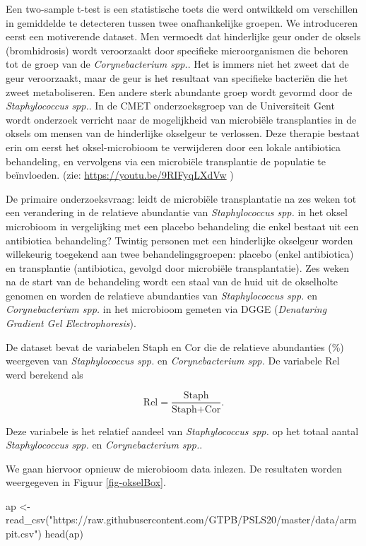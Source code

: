 \documentclass[
  dutch,
  letterpaper,
  12pt]{book}
\newenvironment{Shaded}{\begin{snugshade}}{\end{snugshade}}
\newcommand{\FunctionTok}[1]{\textcolor[rgb]{0.28,0.35,0.67}{#1}}
\newcommand{\NormalTok}[1]{\textcolor[rgb]{0.00,0.23,0.31}{#1}}
\newcommand{\OtherTok}[1]{\textcolor[rgb]{0.00,0.23,0.31}{#1}}
\newcommand{\StringTok}[1]{\textcolor[rgb]{0.13,0.47,0.30}{#1}}
\theoremstyle{definition}
\theoremstyle{definition}
\theoremstyle{definition}
\theoremstyle{remark}
\begin{document}
Een two-sample t-test is een statistische toets die werd ontwikkeld om
verschillen in gemiddelde te detecteren tussen twee onafhankelijke
groepen. We introduceren eerst een motiverende dataset. Men vermoedt dat
hinderlijke geur onder de oksels (bromhidrosis) wordt veroorzaakt door
specifieke microorganismen die behoren tot de groep van de
\emph{Corynebacterium spp.}. Het is immers niet het zweet dat de geur
veroorzaakt, maar de geur is het resultaat van specifieke bacteriën die
het zweet metaboliseren. Een andere sterk abundante groep wordt gevormd
door de \emph{Staphylococcus spp.}. In de CMET onderzoeksgroep van de
Universiteit Gent wordt onderzoek verricht naar de mogelijkheid van
microbiële transplanties in de oksels om mensen van de hinderlijke
okselgeur te verlossen. Deze therapie bestaat erin om eerst het
oksel-microbioom te verwijderen door een lokale antibiotica behandeling,
en vervolgens via een microbiële transplantie de populatie te
beïnvloeden. (zie: \url{https://youtu.be/9RIFyqLXdVw} )

De primaire onderzoeksvraag: leidt de microbiële transplantatie na zes
weken tot een verandering in de relatieve abundantie van
\emph{Staphylococcus spp.} in het oksel microbioom in vergelijking met
een placebo behandeling die enkel bestaat uit een antibiotica
behandeling? Twintig personen met een hinderlijke okselgeur worden
willekeurig toegekend aan twee behandelingsgroepen: placebo (enkel
antibiotica) en transplantie (antibiotica, gevolgd door microbiële
transplantatie). Zes weken na de start van de behandeling wordt een
staal van de huid uit de okselholte genomen en worden de relatieve
abundanties van \emph{Staphylococcus spp.} en \emph{Corynebacterium
spp.} in het microbioom gemeten via DGGE (\emph{Denaturing Gradient Gel
Electrophoresis}).

De dataset bevat de variabelen Staph en Cor die de relatieve abundanties
(\%) weergeven van \emph{Staphylococcus spp.} en \emph{Corynebacterium
spp.} De variabele Rel werd berekend als

\[\text{Rel}=\frac{\text{Staph}}{\text{Staph}+\text{Cor}}.\]

Deze variabele is het relatief aandeel van \emph{Staphylococcus spp.} op
het totaal aantal \emph{Staphylococcus spp.} en \emph{Corynebacterium
spp.}.

We gaan hiervoor opnieuw de microbioom data inlezen. De resultaten
worden weergegeven in Figuur \ref{fig-okselBox}.

\begin{Shaded}
\begin{Highlighting}[]
\NormalTok{ap }\OtherTok{\textless{}{-}} \FunctionTok{read\_csv}\NormalTok{(}\StringTok{"https://raw.githubusercontent.com/GTPB/PSLS20/master/data/armpit.csv"}\NormalTok{)}
\FunctionTok{head}\NormalTok{(ap)}
\end{Highlighting}
\end{Shaded}
\end{document}
